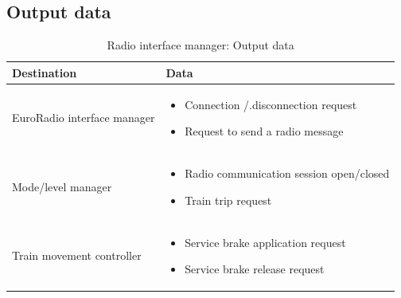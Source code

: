 \documentclass[nocc]{template/openetcs_report}
\begin{document}
\subsection{Output data}
			\begin{longtable}{|l|l|}
				\caption{Radio interface manager: Output data}\\ 
				\hline
				
					\begin{minipage}[t]{0.35\linewidth} \textbf{Destination}	\end{minipage} 
				&	\begin{minipage}[t]{0.65\linewidth} \textbf{Data} \end{minipage} \\
				
				\hline
																																									
					\begin{minipage}[t]{0.35\linewidth} EuroRadio interface manager	\end{minipage} 
				&	\begin{minipage}[t]{0.65\linewidth}
						\begin{itemize}
							\item Connection /.disconnection request
							\item Request to send a radio message
						\end{itemize}
					\end{minipage} \\
				
				\hline
				
					\begin{minipage}[t]{0.35\linewidth} Mode/level manager	\end{minipage} 
				&	\begin{minipage}[t]{0.65\linewidth}
						\begin{itemize}
							\item Radio communication session open/closed
							\item Train trip request
						\end{itemize}			
					\end{minipage} \\
				
				\hline	
				
					\begin{minipage}[t]{0.35\linewidth} Train movement controller	\end{minipage} 
				&	\begin{minipage}[t]{0.65\linewidth}
						\begin{itemize}
							\item Service brake application request
							\item Service brake release request
						\end{itemize}			
					\end{minipage} \\
				

\end{longtable}
\end{document}
